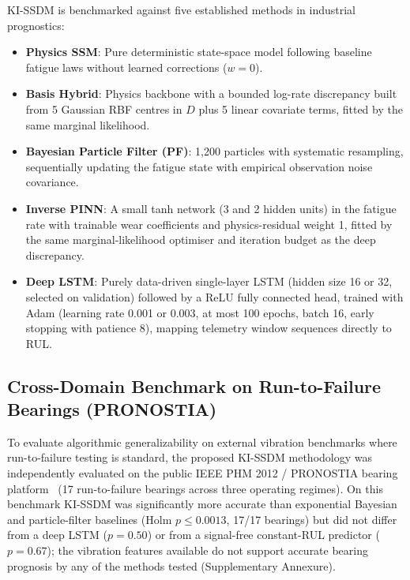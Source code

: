 \documentclass[a4paper,fleqn]{cas-dc}
\begin{document}
KI-SSDM is benchmarked against five established methods in industrial prognostics:
\begin{itemize}[leftmargin=1.5em]
    \item \textbf{Physics SSM}: Pure deterministic state-space model following baseline fatigue laws without learned corrections ($w = 0$).
    \item \textbf{Basis Hybrid}: Physics backbone with a bounded log-rate discrepancy built from 5 Gaussian RBF centres in $D$ plus 5 linear covariate terms, fitted by the same marginal likelihood.
    \item \textbf{Bayesian Particle Filter (PF)}: 1,200 particles with systematic resampling, sequentially updating the fatigue state with empirical observation noise covariance.
    \item \textbf{Inverse PINN}: A small tanh network (3 and 2 hidden units) in the fatigue rate with trainable wear coefficients and physics-residual weight 1, fitted by the same marginal-likelihood optimiser and iteration budget as the deep discrepancy.
    \item \textbf{Deep LSTM}: Purely data-driven single-layer LSTM (hidden size 16 or 32, selected on validation) followed by a ReLU fully connected head, trained with Adam (learning rate 0.001 or 0.003, at most 100 epochs, batch 16, early stopping with patience 8), mapping telemetry window sequences directly to RUL.
\end{itemize}

\subsection{Cross-Domain Benchmark on Run-to-Failure Bearings (PRONOSTIA)}
\label{subsec:pronostia_benchmark_setup}

To evaluate algorithmic generalizability on external vibration benchmarks where run-to-failure testing is standard, the proposed KI-SSDM methodology was independently evaluated on the public IEEE PHM 2012 / PRONOSTIA bearing platform~\cite{Nectoux_2012} (17 run-to-failure bearings across three operating regimes). On this benchmark KI-SSDM was significantly more accurate than exponential Bayesian and particle-filter baselines (Holm $p \le 0.0013$, 17/17 bearings) but did not differ from a deep LSTM ($p = 0.50$) or from a signal-free constant-RUL predictor ($p = 0.67$); the vibration features available do not support accurate bearing prognosis by any of the methods tested (Supplementary Annexure).
\end{document}
